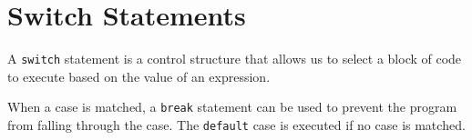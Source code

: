 \documentclass{report}
\begin{document}
\section{Switch Statements}
A \texttt{switch} statement is a control structure that allows us to select a block of code to execute based on the value of an expression.

When a case is matched, a \texttt{break} statement can be used to prevent the program from falling
through the case. The \texttt{default} case is executed if no case is matched.
\end{document}

